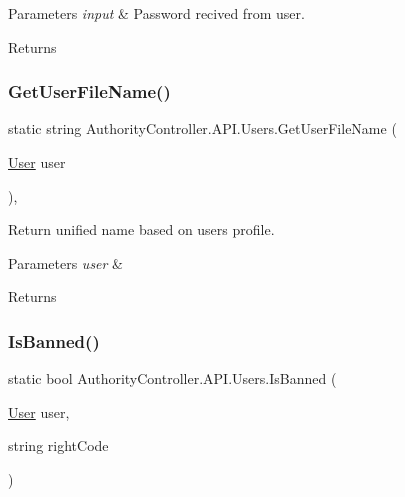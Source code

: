 \begin{DoxyParams}{Parameters}
{\em input} & Password recived from user.\\
\hline
\end{DoxyParams}
\begin{DoxyReturn}{Returns}

\end{DoxyReturn}
\mbox{\label{class_authority_controller_1_1_a_p_i_1_1_users_ac0cc8d945690970c7bac5432fb9baf11}} 
\subsubsection{\texorpdfstring{Get\+User\+File\+Name()}{GetUserFileName()}}
{\footnotesize\ttfamily static string Authority\+Controller.\+A\+P\+I.\+Users.\+Get\+User\+File\+Name (\begin{DoxyParamCaption}\item[{\mbox{\hyperlink{class_authority_controller_1_1_data_1_1_user}{User}}}]{user }\end{DoxyParamCaption})\hspace{0.3cm}{\ttfamily [static]}, {\ttfamily [private]}}



Return unified name based on user\textquotesingle{}s profile. 


\begin{DoxyParams}{Parameters}
{\em user} & \\
\hline
\end{DoxyParams}
\begin{DoxyReturn}{Returns}

\end{DoxyReturn}
\mbox{\label{class_authority_controller_1_1_a_p_i_1_1_users_ab23c24d29e83e28d25452f7da05b427d}} 
\subsubsection{\texorpdfstring{Is\+Banned()}{IsBanned()}}
{\footnotesize\ttfamily static bool Authority\+Controller.\+A\+P\+I.\+Users.\+Is\+Banned (\begin{DoxyParamCaption}\item[{\mbox{\hyperlink{class_authority_controller_1_1_data_1_1_user}{User}}}]{user,  }\item[{string}]{right\+Code }\end{DoxyParamCaption})\hspace{0.3cm}{\ttfamily [static]}}



